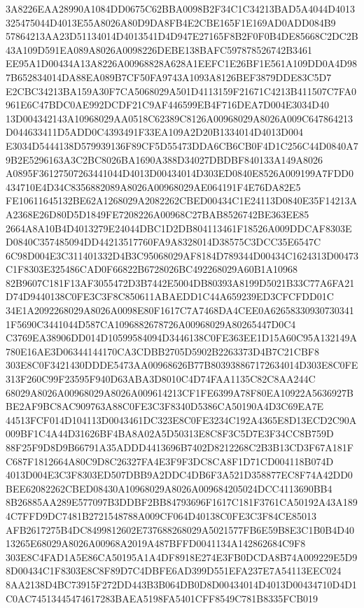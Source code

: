 \documentclass[UTF8,fontset=fandol,zihao=-4,a4paper]{ctexart}
\begin{document}
{{3A8226EAA28990A1084DD0675C62BBA0098B2F34C1C34213BAD5A4044D4013325475044D4013E55A8026A80D9DA8FB4E2CBE165F1E169AD0ADD084B9
57864213AA23D51134014D4013541D4D947E27165F8B2F0F0B4DE85668C2DC2B43A109D591EA089A8026A0098226DEBE138BAFC597878526742B3461
EE95A1D00434A13A8226A00968828A628A1EEFC1E26BF1E561A109DD0A4D987B652834014DA88EA089B7CF50FA9743A1093A8126BEF3879DDE83C5D7
E2CBC34213BA159A30F7CA5068029A501D4113159F21671C4213B411507C7FA0961E6C47BDC0AE992DCDF21C9AF446599EB4F716DEA7D004E3034D40
13D004342143A10968029AA0518C62389C8126A00968029A8026A009C647864213D044633411D5ADD0C4393491F33EA109A2D20B1334014D4013D004
E3034D5444138D579939136F89CF5D55473DDA6CB6CB0F4D1C256C44D0840A79B2E5296163A3C2BC8026BA1690A388D34027DBDBF840133A149A8026
A0895F36127507263441044D4013D00434014D303ED0840E8526A009199A7FDD0434710E4D34C8356882089A8026A00968029AE064191F4E76DA82E5
FE10611645132BE62A1268029A2082262CBED00434C1E24113D0840E35F14213AA2368E26D80D5D1849FE7208226A00968C27BAB8526742BE363EE85
2664A8A10B4D4013279E24044DBC1D2DB804113461F18526A009DDCAF8303ED0840C357485094DD44213517760FA9A8328014D38575C3DCC35E6547C
6C98D004E3C311401332D4B3C95068029AF8184D789344D00434C1624313D00473C1F8303E325486CAD0F66822B6728026BC492268029A60B1A10968
82B9607C181F13AF3055472D3B7442E5004DB80393A8199D5021B33C77A6FA21D74D9440138C0FE3C3F8C850611ABAEDD1C44A659239ED3CFCFDD01C
34E1A2092268029A8026A0098E80F1617C7A7468DA4CEE0A626583309307303411F5690C3441044D587CA1096882678726A00968029A80265447D0C4
C3769EA38906DD014D10599584094D3446138C0FE363EE1D15A60C95A132149A780E16AE3D06344144170CA3CDBB2705D5902B2263373D4B7C21CBF8
303E8C0F3421430DDDE5473AA00968626B77B803938867172634014D303E8C0FE313F260C99F23595F940D63ABA3D8010C4D74FAA1135C82C8AA244C
68029A8026A00968029A8026A009614213CF1FE6399A78F80EA10922A5636927BBE2AF9BC8AC909763A88C0FE3C3F8340D5386CA50190A4D3C69EA7E
44513FCF014D104113D0043461DC323E8C0FE3234C192A4365E8D13ECD2C90A009BF1C4A44D31626BF4BA8A02A5D50313E8C8F3C5D7E3F34CC8B759D
88F25F9D8D9B66791A35ADDD4413696B7402D8212268C2B3B13CD3F67A181FC687F1812664A80C9D8C26327FA4E3F9F3DC8CA8F1D71CD004118B074D
4013D004E3C3F8303ED507DBB9A2DDC4DB6F3A521D358877EC8F74A42DD0BEE62082262CBED08430A10968029A8026A009684205024DCC4113690BB4
8B26885AA289E577097B3DDBF2BB84793696F1617C181F3761CA50192A43A1894C7FFD9DC7481B2721548788A009CF064D40138C0FE3C3F84CE85013
AFB2617275B4DC8499812602E737688268029A5021577FB6E59B8E3C1B0B4D4013265E68029A8026A00968A2019A487BFFD0041134A142862684C9F8
303E8C4FAD1A5E86CA50195A1A4DF8918E274E3FB0DCDA8B74A009229E5D98D00434C1F8303E8C8F89D7C4DBFE6AD399D551EFA237E7A54113EEC024
8AA2138D4BC73915F272DD443B3B064DB0D8D00434014D4013D00434710D4D1C0AC74513445474617283BAEA5198FA5401CFF8549C781B8335FCB019
}}
\end{document}
